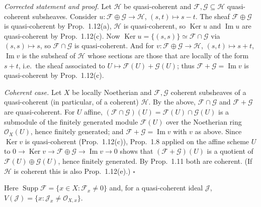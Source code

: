 \documentclass[11pt]{article}
\begin{document}
\emph{Corrected statement and proof.} Let $\mathcal{H}$ be quasi-coherent and $\mathcal{F},\mathcal{G}\subseteq\mathcal{H}$ quasi-coherent subsheaves. Consider $u:\mathcal{F}\oplus\mathcal{G}\to\mathcal{H}$, $(s,t)\mapsto s-t$. The sheaf $\mathcal{F}\oplus\mathcal{G}$ is quasi-coherent by Prop.~1.12(a), $\mathcal{H}$ is quasi-coherent, so $\operatorname{Ker}u$ and $\operatorname{Im}u$ are quasi-coherent by Prop.~1.12(c). Now $\operatorname{Ker}u=\{(s,s)\}\simeq\mathcal{F}\cap\mathcal{G}$ via $(s,s)\mapsto s$, so $\mathcal{F}\cap\mathcal{G}$ is quasi-coherent. And for $v:\mathcal{F}\oplus\mathcal{G}\to\mathcal{H}$, $(s,t)\mapsto s+t$, $\operatorname{Im}v$ is the subsheaf of $\mathcal{H}$ whose sections are those that are locally of the form $s+t$, i.e.\ the sheaf associated to $U\mapsto\mathcal{F}(U)+\mathcal{G}(U)$; thus $\mathcal{F}+\mathcal{G}=\operatorname{Im}v$ is quasi-coherent by Prop.~1.12(c).

\emph{Coherent case.} Let $X$ be locally Noetherian and $\mathcal{F},\mathcal{G}$ coherent subsheaves of a quasi-coherent (in particular, of a coherent) $\mathcal{H}$. By the above, $\mathcal{F}\cap\mathcal{G}$ and $\mathcal{F}+\mathcal{G}$ are quasi-coherent. For $U$ affine, $(\mathcal{F}\cap\mathcal{G})(U)=\mathcal{F}(U)\cap\mathcal{G}(U)$ is a submodule of the finitely generated module $\mathcal{F}(U)$ over the Noetherian ring $\mathcal{O}_X(U)$, hence finitely generated; and $\mathcal{F}+\mathcal{G}=\operatorname{Im}v$ with $v$ as above. Since $\operatorname{Ker}v$ is quasi-coherent (Prop.~1.12(c)), Prop.~1.8 applied on the affine scheme $U$ to $0\to\operatorname{Ker}v\to\mathcal{F}\oplus\mathcal{G}\to\operatorname{Im}v\to0$ shows that $(\mathcal{F}+\mathcal{G})(U)$ is a quotient of $\mathcal{F}(U)\oplus\mathcal{G}(U)$, hence finitely generated. By Prop.~1.11 both are coherent. (If $\mathcal{H}$ is coherent this is also Prop.~1.12(e).) \hfill$\square$

\pf
Here $\operatorname{Supp}\mathcal{F}=\{x\in X:\mathcal{F}_x\neq0\}$ and, for a quasi-coherent ideal $\mathcal{J}$, $V(\mathcal{J})=\{x:\mathcal{J}_x\neq\mathcal{O}_{X,x}\}$.
\end{document}
